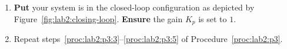 \begin{procedure}[label={proc:lab2:p4}]
  \begin{enumerate}[label=(\arabic*)]
    \item{
      \textbf{Put} your system is in the closed-loop configuration as
      depicted by Figure~\ref{fig:lab2:closing-loop}.
      \textbf{Ensure} the gain \(K_p\) is set to \(1.\)
    }
    \item{
      Repeat steps~\ref{proc:lab2:p3:3}--\ref{proc:lab2:p3:5} of
      Procedure~\ref{proc:lab2:p3}.
    }
  \end{enumerate}
\end{procedure}
%

